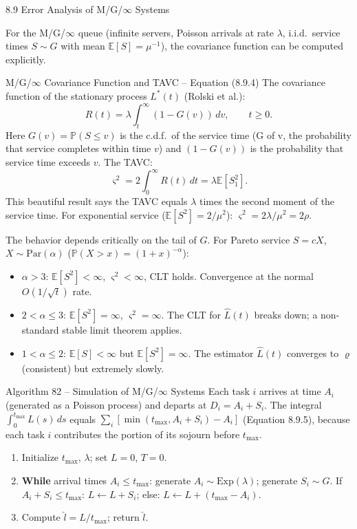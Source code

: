 \documentclass[aspectratio=169,10pt]{beamer}
\newcommand{\E}{\mathbb{E}}
\newcommand{\Prob}{\mathbb{P}}
\begin{document}
\begin{frame}[allowframebreaks]{8.9 Error Analysis of M/G/$\infty$ Systems}

For the M/G/$\infty$ queue (infinite servers, Poisson arrivals at rate $\lambda$,
i.i.d.\ service times $S \sim G$ with mean $\E[S] = \mu^{-1}$), the covariance
function can be computed explicitly.

\begin{block}{M/G/$\infty$ Covariance Function and TAVC -- Equation (8.9.4)}
The covariance function of the stationary process $L^*(t)$ (Rolski et al.):
\[
  R(t) = \lambda\int_t^\infty(1-G(v))\,dv, \qquad t \ge 0.
\]
Here $G(v) = \Prob(S \le v)$ is the c.d.f.\ of the service time (G of v, the
probability that service completes within time $v$) and $(1-G(v))$ is the
probability that service time exceeds $v$.  The TAVC:
\[
  \varsigma^2 = 2\int_0^\infty R(t)\,dt = \lambda\E[S_1^2].
\]
This beautiful result says the TAVC equals $\lambda$ times the second moment of
the service time.  For exponential service ($\E[S^2] = 2/\mu^2$):
$\varsigma^2 = 2\lambda/\mu^2 = 2\rho$.
\end{block}

The behavior depends critically on the tail of $G$.  For Pareto service
$S = cX$, $X \sim \mathrm{Par}(\alpha)$ ($\Prob(X > x) = (1+x)^{-\alpha}$):
\begin{itemize}
  \item $\alpha > 3$: $\E[S^2] < \infty$, $\varsigma^2 < \infty$, CLT holds.
        Convergence at the normal $O(1/\sqrt{t})$ rate.
  \item $2 < \alpha \le 3$: $\E[S^2] = \infty$, $\varsigma^2 = \infty$.
        The CLT for $\hat{L}(t)$ breaks down; a non-standard stable limit theorem
        applies.
  \item $1 < \alpha \le 2$: $\E[S] < \infty$ but $\E[S^2] = \infty$.  The
        estimator $\hat{L}(t)$ converges to $\varrho$ (consistent) but
        extremely slowly.
\end{itemize}

\framebreak

\begin{block}{Algorithm 82 -- Simulation of M/G/$\infty$ Systems}
Each task $i$ arrives at time $A_i$ (generated as a Poisson process) and departs
at $D_i = A_i + S_i$.  The integral $\int_0^{t_{\max}} L(s)\,ds$ equals
$\sum_i [\min(t_{\max}, A_i + S_i) - A_i]$ (Equation 8.9.5), because each task
$i$ contributes the portion of its sojourn before $t_{\max}$.

\begin{enumerate}
  \item Initialize $t_{\max}$, $\lambda$; set $L = 0$, $T = 0$.
  \item \textbf{While} arrival times $A_i \le t_{\max}$:
        generate $A_i \sim \mathrm{Exp}(\lambda)$; generate $S_i \sim G$.
        If $A_i + S_i \le t_{\max}$: $L \leftarrow L + S_i$; else:
        $L \leftarrow L + (t_{\max} - A_i)$.
  \item Compute $\hat{l} = L / t_{\max}$; return $\hat{l}$.
\end{enumerate}
\end{block}


\end{frame}
\end{document}
